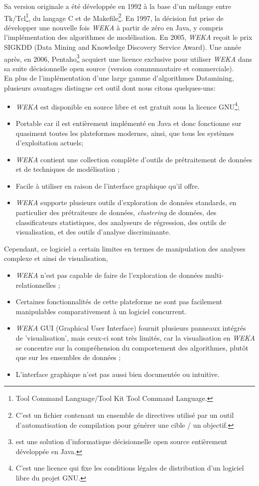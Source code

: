 Sa version originale a été développée en 1992 à la base d'un mélange entre Tk/Tcl\footnote{Tool Command Language/Tool Kit Tool Command Language.}, du langage C et de Makefile\footnote{C'est un fichier contenant un ensemble de directives utilisé par un outil d'automatisation de compilation pour générer une cible / un objectif.}. En 1997, la décision fut prise de développer une nouvelle fois \textit{WEKA} à partir de zéro en Java, y compris l'implémentation des algorithmes de modélisation. En 2005, \textit{WEKA} reçoit le prix SIGKDD (Data Mining and Knowledge
Discovery Service Award). Une année après, en 2006, Pentaho\footnote{est une solution d'informatique décisionnelle open source entièrement développée en Java.} acquiert une licence exclusive pour utiliser \textit{WEKA} dans sa suite décisionnelle open source (version communautaire et
commerciale).  \\


En plus de l'implémentation d'une large gamme d’algorithmes Datamining, plusieurs avantages distingue cet outil dont nous citons quelques-uns:
\begin{itemize}
\item[\textbullet] \textit{WEKA} est disponible en source libre et est gratuit sous la licence GNU\footnote{C'est une licence qui fixe les conditions légales de distribution d'un logiciel libre du projet GNU.};
\item[\textbullet] Portable car il est entièrement implémenté en Java et donc fonctionne sur quasiment toutes les plateformes modernes, ainsi, que tous les systèmes d'exploitation actuels;
\item[\textbullet] \textit{WEKA} contient une collection complète d'outils de prétraitement de données et de techniques de modélisation ;
\item[\textbullet] Facile à utiliser en raison de l'interface graphique qu'il offre.
\item[\textbullet] \textit{WEKA} supporte plusieurs outils d'exploration de données standards, en particulier des prétraiteurs de données, \textit{clustering} de données, des classificateurs statistiques, des analyseurs de régression, des outils de visualisation, et des outils d'analyse discriminante.
\end{itemize}
Cependant, ce logiciel a certain limites en termes de manipulation des analyses complexe et ainsi de visualisation,
\begin{itemize}
\item[\textbullet] \textit{WEKA} n'est pas capable de faire de l'exploration de données multi-relationnelles ;
\item[\textbullet] Certaines fonctionnalités de cette plateforme ne sont pas facilement manipulables comparativement à un logiciel concurrent. 
\item[\textbullet] \textit{WEKA} GUI (Graphical User Interface) fournit plusieurs panneaux intégrés de 'visualisation', mais ceux-ci sont très limités, car la visualisation en \textit{WEKA} se concentre sur la compréhension du comportement des algorithmes, plutôt que sur les ensembles de données ;
\item[\textbullet] L’interface graphique n’est pas aussi bien documentée ou intuitive.
\end{itemize}


